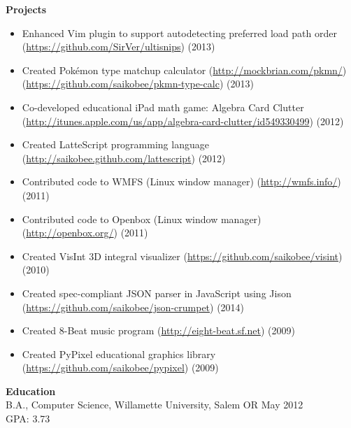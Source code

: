 \documentclass[10pt]{article}
\begin{document}
\medskip
\noindent \textbf{Projects} \hrulefill
\begin{itemize}
\item Enhanced Vim plugin to support autodetecting preferred load path
order \\
    (\url{https://github.com/SirVer/ultisnips}) (2013)
\item Created Pok\'emon type matchup calculator
    (\url{http://mockbrian.com/pkmn/}) \\
    (\url{https://github.com/saikobee/pkmn-type-calc})
    (2013)
\item Co-developed educational iPad math game: Algebra Card Clutter \\
    (\url{http://itunes.apple.com/us/app/algebra-card-clutter/id549330499})
    (2012)
\item Created LatteScript programming language
    (\url{http://saikobee.github.com/lattescript}) (2012)
\item Contributed code to WMFS (Linux window manager)
    (\url{http://wmfs.info/}) (2011)
\item Contributed code to Openbox (Linux window manager)
    (\url{http://openbox.org/}) (2011)
\item Created VisInt 3D integral visualizer
    (\url{https://github.com/saikobee/visint}) (2010)
\item Created spec-compliant JSON parser in JavaScript using Jison
    (\url{https://github.com/saikobee/json-crumpet})
    (2014)
\item Created 8-Beat music program
    (\url{http://eight-beat.sf.net}) (2009)
\item Created PyPixel educational graphics library
    (\url{https://github.com/saikobee/pypixel}) (2009)
\end{itemize}


\medskip
\noindent \textbf{Education} \hrulefill \\
\hangindent=24pt
B.A., Computer Science, Willamette University, Salem OR
May 2012 \\
GPA: 3.73
\end{document}
